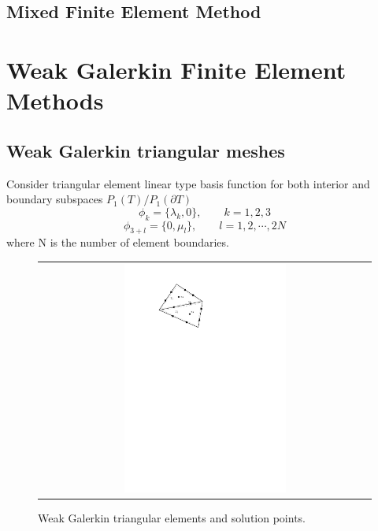 \subsection{Mixed Finite Element Method}



\section{Weak Galerkin Finite Element Methods}
\subsection{Weak Galerkin triangular meshes}

Consider triangular element linear type basis function for both interior and boundary subspaces $ P_{1}(T) / P_{1} (\partial T) $
\begin{equation}
\phi_{k} = \{ \lambda_{k}, 0 \}, \qquad k = 1,2, 3
\end{equation}
\begin{equation}
\phi_{3 + l} = \{ 0, \mu_{l} \}, \qquad l = 1, 2, \cdots , 2N
\end{equation}
where N is the number of element boundaries.

\begin{figure}[h]
	\centering
	\begin{tabular}{c}
		\includegraphics[width=0.5\textwidth]{./pics/triangle.pdf}
	\end{tabular}
	\caption{\footnotesize Weak Galerkin triangular elements and solution points.}\label{fig1: triangle}
\end{figure}

